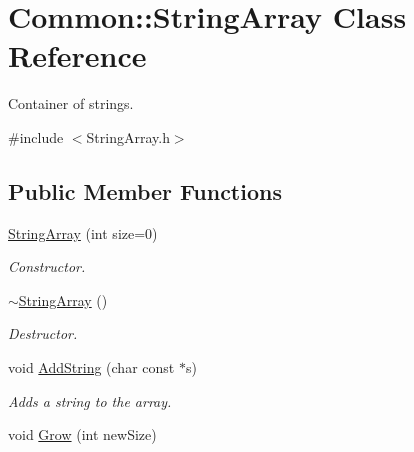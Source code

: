 \hypertarget{class_common_1_1_string_array}{\section{Common\-:\-:String\-Array Class Reference}
\label{class_common_1_1_string_array}
}


Container of strings.  




{\ttfamily \#include $<$String\-Array.\-h$>$}

\subsection*{Public Member Functions}
\begin{DoxyCompactItemize}
\item 
\hyperlink{class_common_1_1_string_array_a49688adeedadd258740fa8026bc1c719}{String\-Array} (int size=0)
\begin{DoxyCompactList}\small\item\em Constructor. \end{DoxyCompactList}\item 
\hypertarget{class_common_1_1_string_array_af1fc945005ae8a218d30c3281e0b64bd}{\hyperlink{class_common_1_1_string_array_af1fc945005ae8a218d30c3281e0b64bd}{$\sim$\-String\-Array} ()}\label{class_common_1_1_string_array_af1fc945005ae8a218d30c3281e0b64bd}

\begin{DoxyCompactList}\small\item\em Destructor. \end{DoxyCompactList}\item 
\hypertarget{class_common_1_1_string_array_a7714fa20799b5fe1983553c7d083bf93}{void \hyperlink{class_common_1_1_string_array_a7714fa20799b5fe1983553c7d083bf93}{Add\-String} (char const $\ast$s)}\label{class_common_1_1_string_array_a7714fa20799b5fe1983553c7d083bf93}

\begin{DoxyCompactList}\small\item\em Adds a string to the array. \end{DoxyCompactList}\item 
\hypertarget{class_common_1_1_string_array_af45ef5c139d1db092d08d5b173c3731c}{void \hyperlink{class_common_1_1_string_array_af45ef5c139d1db092d08d5b173c3731c}{Grow} (int new\-Size)}\label{class_common_1_1_string_array_af45ef5c139d1db092d08d5b173c3731c}


\end{DoxyCompactItemize}
